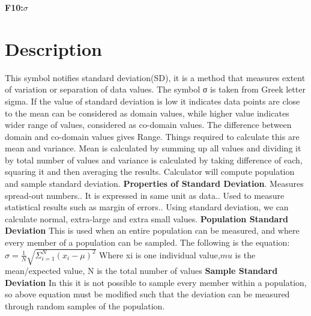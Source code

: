 \documentclass{article}
\begin{document}
\begin{titlepage}
    \begin{center}
        \large\textbf{F10:$\sigma$}
    \end{center}
    
\section*{Description}
This symbol notifies standard deviation(SD), it is a method that measures extent of variation or separation of data values. The symbol σ  is taken from Greek letter sigma. If the value of standard deviation is low it indicates data points are close to the mean can be considered as domain values, while higher value indicates wider range of values, considered as co-domain values. The difference between domain and co-domain values gives Range. Things required to calculate this are mean and variance. Mean is calculated by summing up all values and dividing it by total number of values and variance is calculated by taking difference of each, squaring it and then averaging the results. Calculator will compute population and sample standard deviation.\newline
\textbf{Properties of Standard Deviation}.	Measures spread-out numbers..	It is expressed in same unit as data..	Used to measure statistical results such as margin of errors..	Using standard deviation, we can calculate normal, extra-large and extra small values.
\newline
\newline
\textbf{Population Standard Deviation}
\newline
This is used when an entire population can be measured, and where every member of a population can be sampled. The following is the equation:
\newline
\begin{math}
\sigma=\frac{1}{N}\sqrt{\Sigma_{i=1}^{N}(x_{i}-\mu)^2}
\end{math}
Where
xi is one individual value,$mu$ is the mean/expected value, N is the total number of values
\newline
\newline
\textbf{Sample Standard Deviation}
\newline
In this it is not possible to sample every member within a population, so above equation must be modified such that the deviation can be measured through random samples of the population. 

\end{titlepage}
\end{document}
